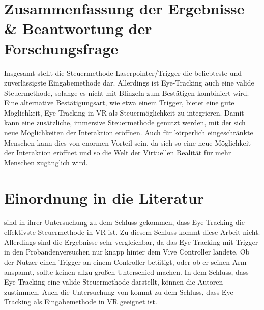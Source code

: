 \section{Zusammenfassung der Ergebnisse \& Beantwortung der Forschungsfrage}
Insgesamt stellt die Steuermethode Laserpointer/Trigger die beliebteste und zuverlässigste Eingabemethode dar. Allerdings ist Eye-Tracking auch eine valide Steuermethode, solange es nicht mit Blinzeln zum Bestätigen kombiniert wird. Eine alternative Bestätigungsart, wie etwa einem Trigger, bietet eine gute Möglichkeit, Eye-Tracking in VR als Steuermöglichkeit zu integrieren. Damit kann eine zusätzliche, immersive Steuermethode genutzt werden, mit der sich neue Möglichkeiten der Interaktion eröffnen. Auch für körperlich eingeschränkte Menschen kann dies von enormen Vorteil sein, da sich so eine neue Möglichkeit der Interaktion eröffnet und so die Welt der Virtuellen Realität für mehr Menschen zugänglich wird. 

\section{Einordnung in die Literatur}
\citeauthor{Pai.2019} sind in ihrer Untersuchung zu dem Schluss gekommen, dass Eye-Tracking die effektivste Steuermethode in VR ist. Zu diesem Schluss kommt diese Arbeit nicht. Allerdings sind die Ergebnisse sehr vergleichbar, da das Eye-Tracking mit Trigger in den Probandenversuchen nur knapp hinter dem Vive Controller landete. Ob der Nutzer einen Trigger an einem Controller betätigt, oder ob er seinen Arm anspannt, sollte keinen allzu großen Unterschied machen. In dem Schluss, dass Eye-Tracking eine valide Steuermethode darstellt, können die Autoren \citeauthor{Pai.2019} zustimmen. Auch die Untersuchung von \citeauthor{D.Kumar.2016} kommt zu dem Schluss, dass Eye-Tracking als Eingabemethode in VR geeignet ist. 

